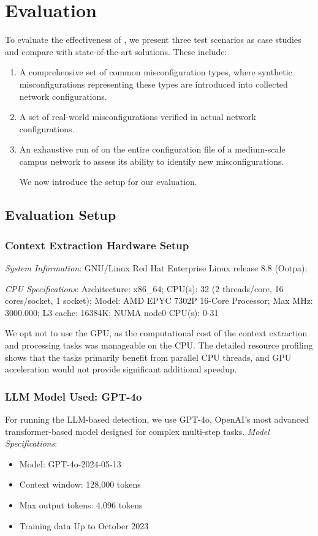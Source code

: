 \section{Evaluation}
\label{sec:eval}
To evaluate the effectiveness of \sysname{}, we present three test scenarios as case studies and compare \sysname{} with state-of-the-art solutions. These include:
\begin{enumerate}
    \item A comprehensive set of common misconfiguration types, where synthetic misconfigurations representing these types are introduced into collected network configurations.
    \item A set of real-world misconfigurations verified in actual network configurations.
    \item An exhaustive run of \sysname{} on the entire configuration file of a medium-scale campus network to assess its ability to identify new misconfigurations.
    
We now introduce the setup for our evaluation.
\end{enumerate}
\subsection{Evaluation Setup}
\subsubsection{Context Extraction Hardware Setup}


\textit{System Information}: GNU/Linux Red Hat Enterprise Linux release 8.8 (Ootpa);

\textit{CPU Specifications}: Architecture: x86\_64; CPU(s): 32 (2 threads/core, 16 cores/socket, 1 socket); Model: AMD EPYC 7302P 16-Core Processor; Max MHz: 3000.000; L3 cache: 16384K; NUMA node0 CPU(s): 0-31 

We opt not to use the GPU, as the computational cost of the context extraction and processing tasks was manageable on the CPU. The detailed resource profiling shows that the tasks primarily benefit from parallel CPU threads, and GPU acceleration would not provide significant additional speedup.


\subsubsection{LLM Model Used: GPT-4o} For running the LLM-based detection, we use GPT-4o, OpenAI's most advanced transformer-based model designed for complex multi-step tasks.
\textit{Model Specifications}:
\begin{itemize}
    \item Model: GPT-4o-2024-05-13
    \item Context window: 128,000 tokens 
    \item Max output tokens: 4,096 tokens
    \item Training data Up to October 2023
\end{itemize}

